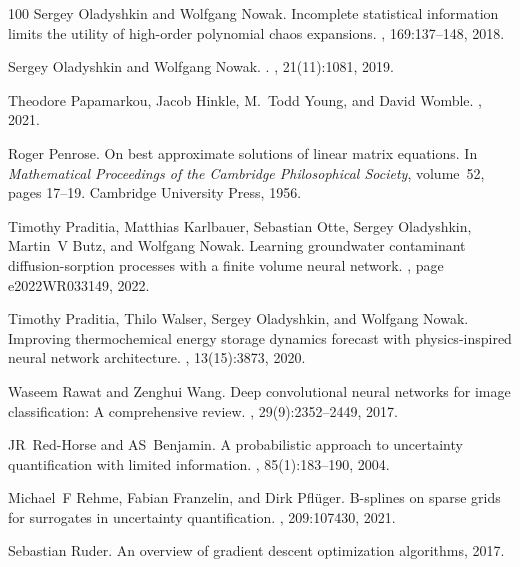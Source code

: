 \documentclass[a4paper,fleqn]{article}
\begin{document}
\begin{thebibliography}{100}
Sergey Oladyshkin and Wolfgang Nowak.
\newblock Incomplete statistical information limits the utility of high-order
  polynomial chaos expansions.
, 169:137--148, 2018.

Sergey Oladyshkin and Wolfgang Nowak.
.
, 21(11):1081, 2019.

Theodore Papamarkou, Jacob Hinkle, M.~Todd Young, and David Womble.
, 2021.

Roger Penrose.
\newblock On best approximate solutions of linear matrix equations.
\newblock In {\em Mathematical Proceedings of the Cambridge Philosophical
  Society}, volume~52, pages 17--19. Cambridge University Press, 1956.

Timothy Praditia, Matthias Karlbauer, Sebastian Otte, Sergey Oladyshkin,
  Martin~V Butz, and Wolfgang Nowak.
\newblock Learning groundwater contaminant diffusion-sorption processes with a
  finite volume neural network.
, page e2022WR033149, 2022.

Timothy Praditia, Thilo Walser, Sergey Oladyshkin, and Wolfgang Nowak.
\newblock Improving thermochemical energy storage dynamics forecast with
  physics-inspired neural network architecture.
, 13(15):3873, 2020.

Waseem Rawat and Zenghui Wang.
\newblock Deep convolutional neural networks for image classification: A
  comprehensive review.
, 29(9):2352--2449, 2017.

JR~Red-Horse and AS~Benjamin.
\newblock A probabilistic approach to uncertainty quantification with limited
  information.
, 85(1):183--190, 2004.

Michael~F Rehme, Fabian Franzelin, and Dirk Pfl{\"u}ger.
\newblock B-splines on sparse grids for surrogates in uncertainty
  quantification.
, 209:107430, 2021.

Sebastian Ruder.
\newblock An overview of gradient descent optimization algorithms, 2017.


\end{thebibliography}
\end{document}

